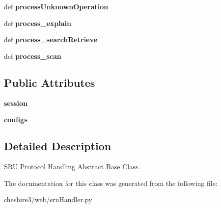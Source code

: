 \begin{DoxyCompactItemize}
\item 
\hypertarget{classcheshire3_1_1web_1_1sru_handler_1_1_s_r_u_protocol_handler_ae0fa0f86ea4380aa43dd9becc1707b9f}{def {\bfseries process\-Unknown\-Operation}}\label{classcheshire3_1_1web_1_1sru_handler_1_1_s_r_u_protocol_handler_ae0fa0f86ea4380aa43dd9becc1707b9f}

\item 
\hypertarget{classcheshire3_1_1web_1_1sru_handler_1_1_s_r_u_protocol_handler_a55534a888fac001d264990137e5bc578}{def {\bfseries process\-\_\-explain}}\label{classcheshire3_1_1web_1_1sru_handler_1_1_s_r_u_protocol_handler_a55534a888fac001d264990137e5bc578}

\item 
\hypertarget{classcheshire3_1_1web_1_1sru_handler_1_1_s_r_u_protocol_handler_a6245584bf91305e8f624c3f960b63e6c}{def {\bfseries process\-\_\-search\-Retrieve}}\label{classcheshire3_1_1web_1_1sru_handler_1_1_s_r_u_protocol_handler_a6245584bf91305e8f624c3f960b63e6c}

\item 
\hypertarget{classcheshire3_1_1web_1_1sru_handler_1_1_s_r_u_protocol_handler_a1aee29c7b659739b29e0c75f17e16499}{def {\bfseries process\-\_\-scan}}\label{classcheshire3_1_1web_1_1sru_handler_1_1_s_r_u_protocol_handler_a1aee29c7b659739b29e0c75f17e16499}

\end{DoxyCompactItemize}
\subsection*{Public Attributes}
\begin{DoxyCompactItemize}
\item 
\hypertarget{classcheshire3_1_1web_1_1sru_handler_1_1_s_r_u_protocol_handler_ac4a538de4d69f7e2edcb1b67abb3dac0}{{\bfseries session}}\label{classcheshire3_1_1web_1_1sru_handler_1_1_s_r_u_protocol_handler_ac4a538de4d69f7e2edcb1b67abb3dac0}

\item 
\hypertarget{classcheshire3_1_1web_1_1sru_handler_1_1_s_r_u_protocol_handler_a8d0a1a1102bb462f873f2ab8c3355f86}{{\bfseries configs}}\label{classcheshire3_1_1web_1_1sru_handler_1_1_s_r_u_protocol_handler_a8d0a1a1102bb462f873f2ab8c3355f86}

\end{DoxyCompactItemize}


\subsection{Detailed Description}
\begin{DoxyVerb}SRU Protocol Handling Abstract Base Class.\end{DoxyVerb}
 

The documentation for this class was generated from the following file\-:\begin{DoxyCompactItemize}
\item 
cheshire3/web/sru\-Handler.\-py\end{DoxyCompactItemize}
